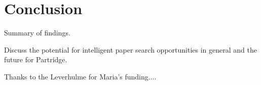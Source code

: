 \documentclass{svmult}
\begin{document}
%
%
%
%
%


\section{Conclusion}
\label{sec:4}

Summary of findings.

Discuss the potential for intelligent paper search opportunities in general and the future for Partridge.

\begin{acknowledgement}
Thanks to the Leverhulme for Maria's funding....
\end{acknowledgement}
%





%
\end{document}
